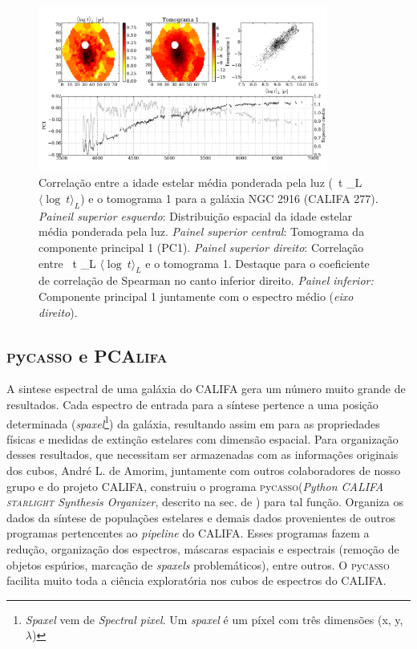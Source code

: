 \documentclass[a4paper,12pt]{article}
\newcommand\pycasso{\textsc{p}y\textsc{casso}\xspace}
\newcommand\pcalifa{PCA\textsc{lifa}\xspace}
\newcommand{\meanL}[1]{\relax\ifmmode \langle #1 \rangle_L \else $\langle #1 \rangle_L$\xspace \fi}
\def\starlight{\textsc{starlight}\xspace}      %
\begin{document}
\begin{figure}
	\begin{center}
    \includegraphics[width=0.85\textwidth]{figuras/K0277-f_obs_norm_pc_1_prop_0.pdf}
    \caption[]{Correla\c{c}\~ao entre a idade estelar média ponderada pela luz (\meanL{\log\ t}) e o tomograma 1 para a galáxia NGC 2916 (CALIFA 277).
    {\em Paineil superior esquerdo}: Distribui\c{c}\~ao espacial da idade estelar média ponderada pela luz. {\em Painel superior central}:
    Tomograma da componente principal 1 (PC1). {\em Painel superior direito}: Correla\c{c}\~ao entre \meanL{\log\ t} e o tomograma 1. Destaque para o
    coeficiente de correla\c{c}\~ao de Spearman no canto inferior direito. {\em Painel inferior:} Componente principal 1 juntamente com o espectro
    médio ({\em eixo direito}).}
    \label{fig:K0277corre}
    \end{center}
\end{figure}

\subsection{\pycasso e \pcalifa}
A sintese espectral de uma galáxia do CALIFA gera um número muito grande de resultados. Cada espectro de entrada para a síntese pertence a uma posição
determinada ({\em spaxel}\footnote{{\em Spaxel} vem de {\em Spectral pixel}. Um {\em spaxel} é um píxel com três dimensões (x, y, $\lambda$)}) da
galáxia, resultando assim em para as propriedades físicas e medidas de extinção estelares com dimensão espacial. Para organização desses resultados,
que necessitam ser armazenadas com as informações originais dos cubos, André L. de Amorim, juntamente com outros colaboradores de nosso grupo e do
projeto CALIFA, construiu o programa \pycasso ({\em Python CALIFA \starlight Synthesis Organizer}, descrito na sec. de \citet{CidFernandes2013})
para tal função. Organiza os dados da síntese de populações estelares e demais dados provenientes de outros programas pertencentes ao {\em pipeline}
do CALIFA. Esses programas fazem a redução, organização dos espectros, máscaras espaciais e espectrais (remoção de objetos espúrios, marcação de {\em
spaxels} problemáticos), entre outros. O \pycasso facilita muito toda a ciência exploratória nos cubos de espectros do CALIFA. 
\end{document}
